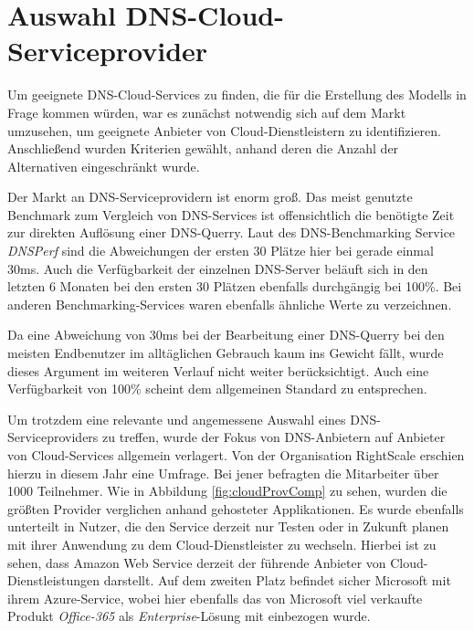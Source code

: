 \section{Auswahl DNS-Cloud-Serviceprovider}
Um geeignete DNS-Cloud-Services zu finden, die für die Erstellung des Modells in Frage kommen würden, war es zunächst notwendig sich auf dem Markt umzusehen, um geeignete Anbieter von Cloud-Dienstleistern zu identifizieren. Anschließend wurden Kriterien gewählt, anhand deren die Anzahl der Alternativen eingeschränkt wurde. 

Der Markt an DNS-Serviceprovidern ist enorm groß. Das meist genutzte Benchmark zum Vergleich von DNS-Services ist offensichtlich die benötigte Zeit zur direkten Auflösung einer DNS-Querry. Laut des DNS-Benchmarking Service \textit{DNSPerf} sind die Abweichungen der ersten 30 Plätze hier bei gerade einmal 30ms. Auch die Verfügbarkeit der einzelnen DNS-Server beläuft sich in den letzten 6 Monaten bei den ersten 30 Plätzen ebenfalls durchgängig bei 100\%. Bei anderen Benchmarking-Services waren ebenfalls ähnliche Werte zu verzeichnen. \cite{DNSPerf.2018}

Da eine Abweichung von 30ms bei der Bearbeitung einer DNS-Querry bei den meisten Endbenutzer im alltäglichen Gebrauch kaum ins Gewicht fällt, wurde dieses Argument im weiteren Verlauf nicht weiter berücksichtigt. Auch eine Verfügbarkeit von 100\% scheint dem allgemeinen Standard zu entsprechen.

Um trotzdem eine relevante und angemessene Auswahl eines DNS-Serviceproviders zu treffen, wurde der Fokus von DNS-Anbietern auf Anbieter von Cloud-Services allgemein verlagert. Von der Organisation RightScale erschien hierzu in diesem Jahr eine Umfrage. Bei jener befragten die Mitarbeiter über 1000 Teilnehmer. Wie in Abbildung \ref{fig:cloudProvComp} zu sehen, wurden die größten Provider verglichen anhand gehosteter Applikationen. Es wurde ebenfalls unterteilt in Nutzer, die den Service derzeit nur Testen oder in Zukunft planen mit ihrer Anwendung zu dem Cloud-Dienstleister zu wechseln. Hierbei ist zu sehen, dass Amazon Web Service derzeit der führende Anbieter von Cloud-Dienstleistungen darstellt. Auf dem zweiten Platz befindet sicher Microsoft mit ihrem Azure-Service, wobei hier ebenfalls das von Microsoft viel verkaufte Produkt \textit{Office-365} als \textit{Enterprise}-Lösung mit einbezogen wurde. \cite{ZDNet.2018b}


